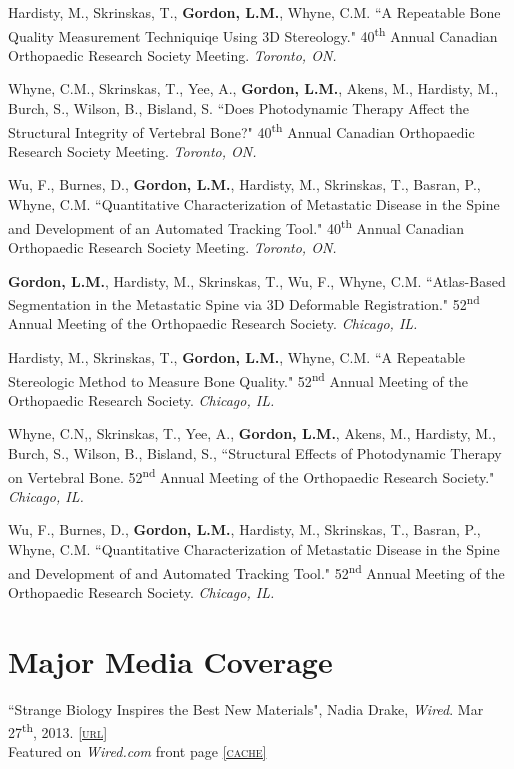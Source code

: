 Hardisty, M., Skrinskas, T., \textbf{Gordon, L.M.}, Whyne, C.M. ``A Repeatable Bone Quality Measurement Techniquiqe Using 3D Stereology." 40\textsuperscript{th} Annual Canadian Orthopaedic Research Society Meeting. \emph{Toronto, ON.}

Whyne, C.M., Skrinskas, T., Yee, A., \textbf{Gordon, L.M.}, Akens, M., Hardisty, M., Burch, S., Wilson, B., Bisland, S. ``Does Photodynamic Therapy Affect the Structural Integrity of Vertebral Bone?" 40\textsuperscript{th} Annual Canadian Orthopaedic Research Society  Meeting. \emph{Toronto, ON.}

Wu, F., Burnes, D., \textbf{Gordon, L.M.}, Hardisty, M., Skrinskas, T., Basran, P., Whyne, C.M. ``Quantitative Characterization of Metastatic Disease in the Spine and Development of an Automated Tracking Tool." 40\textsuperscript{th} Annual Canadian Orthopaedic Research Society Meeting. \emph{Toronto, ON.}

\textbf{Gordon, L.M.}, Hardisty, M., Skrinskas, T., Wu, F., Whyne, C.M. ``Atlas-Based Segmentation in the Metastatic Spine via 3D Deformable Registration." 52\textsuperscript{nd} Annual Meeting of the Orthopaedic Research Society. \emph{Chicago, IL.}

Hardisty, M., Skrinskas, T., \textbf{Gordon, L.M.}, Whyne, C.M. ``A Repeatable Stereologic Method to Measure Bone Quality." 52\textsuperscript{nd} Annual Meeting of the Orthopaedic Research Society. \emph{Chicago, IL.}

Whyne, C.N,, Skrinskas, T., Yee, A., \textbf{Gordon, L.M.}, Akens, M., Hardisty, M., Burch, S., Wilson, B., Bisland, S., ``Structural Effects of Photodynamic Therapy on Vertebral Bone. 52\textsuperscript{nd} Annual Meeting of the Orthopaedic Research Society." \emph{Chicago, IL.}

Wu, F., Burnes, D., \textbf{Gordon, L.M.}, Hardisty, M., Skrinskas, T., Basran, P., Whyne, C.M. ``Quantitative Characterization of Metastatic Disease in the Spine and Development of and Automated Tracking Tool." 52\textsuperscript{nd} Annual Meeting of the Orthopaedic Research Society. \emph{Chicago, IL.}
\endgroup

\section*{Major Media Coverage}
``Strange Biology Inspires the Best New Materials", Nadia Drake, \emph{Wired}. Mar 27\textsuperscript{th}, 2013. \href{http://www.wired.com/wiredscience/2013/03/biomimetic-materials/?utm_source=feedburner&utm_medium=feed&utm_campaign=Feed%3A+wired%2Findex+%28Wired%3A+Top+Stories%29&pid=6577}{\textsc{\footnotesize{[url]}}}\\ Featured on \emph{Wired.com} front page \href{http://lylegordon.ca/wired.jpg}{\textsc{\footnotesize{[cache]}}}
\begingroup\setlength{\parskip}{0.1cm}

